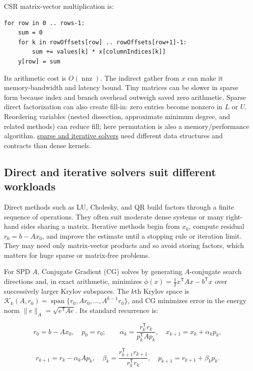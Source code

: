 CSR matrix-vector multiplication is:

\begin{verbatim}
for row in 0 .. rows-1:
    sum = 0
    for k in rowOffsets[row] .. rowOffsets[row+1]-1:
        sum += values[k] * x[columnIndices[k]]
    y[row] = sum
\end{verbatim}

Its arithmetic cost is \(O(\operatorname{nnz})\). The indirect gather from \(x\) can make it memory-bandwidth and latency bound. Tiny matrices can be slower in sparse form because index and branch overhead outweigh saved zero arithmetic. Sparse direct factorization can also create fill-in: zero entries become nonzero in \(L\) or \(U\). Reordering variables (nested dissection, approximate minimum degree, and related methods) can reduce fill; here permutation is also a memory/performance algorithm. \hyperref[02-foundations-ii-ch038]{sparse and iterative solvers} need different data structures and contracts than dense kernels.

\subsection{Direct and iterative solvers suit different workloads}\label{direct-and-iterative-solvers-suit-different-workloads}

Direct methods such as LU, Cholesky, and QR build factors through a finite sequence of operations. They often suit moderate dense systems or many right-hand sides sharing a matrix. Iterative methods begin from \(x_0\), compute residual \(r_0=b-Ax_0\), and improve the estimate until a stopping rule or iteration limit. They may need only matrix-vector products and so avoid storing factors, which matters for huge sparse or matrix-free problems.

For SPD \(A\), Conjugate Gradient (CG) solves by generating \(A\)-conjugate search directions and, in exact arithmetic, minimizes \(\phi(x)=\tfrac12x^\mathsf TAx-b^\mathsf Tx\) over successively larger Krylov subspaces. The \(k\)th Krylov space is \(\mathcal K_k(A,r_0)=\operatorname{span}\{r_0,Ar_0,\ldots,A^{k-1}r_0\}\), and CG minimizes error in the energy norm \(\|e\|_A=\sqrt{e^\mathsf TAe}\). Its standard recurrence is:

\[
r_0=b-Ax_0,\quad p_0=r_0;
\qquad \alpha_k=\frac{r_k^\mathsf Tr_k}{p_k^\mathsf TAp_k},\quad
x_{k+1}=x_k+\alpha_kp_k,
\]

\[
r_{k+1}=r_k-\alpha_kAp_k,\quad
\beta_k=\frac{r_{k+1}^\mathsf Tr_{k+1}}{r_k^\mathsf Tr_k},\quad
p_{k+1}=r_{k+1}+\beta_kp_k.
\]

